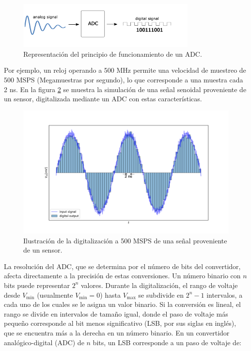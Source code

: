 \documentclass[]{book}
\begin{document}
\begin{figure}[h]
    \centering
    \includegraphics[width=0.8\textwidth]{adc_basic.png}
    \caption{Representación del principio de funcionamiento de un ADC.}
    \label{fig:adc_basic}
\end{figure}

\noindent Por ejemplo, un reloj operando a 500 MHz permite una velocidad de muestreo de 500 MSPS (Megamuestras por segundo), lo que corresponde a una muestra cada 2 ns. En la figura \ref{fig:adc_out} se muestra la simulación de una señal senoidal proveniente de un sensor, digitalizada mediante un ADC con estas características.

\begin{figure}[h]
    \centering
    \includegraphics[width=1.0\textwidth]{adc_out.png}
    \caption{Ilustración de la digitalización a 500 MSPS de una señal proveniente de un sensor.}
    \label{fig:adc_out}

\end{figure}

\noindent La resolución del ADC, que se determina por el número de bits del convertidor, afecta directamente a la precisión de estas conversiones. Un número binario con $n$ bits puede representar $2^{n}$ valores. Durante la digitalización, el rango de voltaje desde $V_{\text{min}}$ (usualmente $V_{\text{min}} = 0$) hasta $V_{\text{max}}$ se subdivide en $2^{n} - 1$ intervalos, a cada uno de los cuales se le asigna un valor binario. Si la conversión es lineal, el rango se divide en intervalos de tamaño igual, donde el paso de voltaje más pequeño corresponde al bit menos significativo (LSB, por sus siglas en inglés), que se encuentra más a la derecha en un número binario. En un convertidor analógico-digital (ADC) de $n$ bits, un LSB corresponde a un paso de voltaje de:
\end{document}
